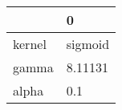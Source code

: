 \begin{tabular}{ll}
\toprule
{} &        0 \\
\midrule
kernel &  sigmoid \\
gamma  &  8.11131 \\
alpha  &      0.1 \\
\bottomrule
\end{tabular}
